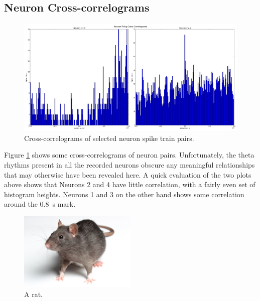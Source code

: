 \documentclass[a4paper, 10pt]{article}
\begin{document}
\subsection*{Neuron Cross-correlograms}
\begin{figure}[H]
  \centering
  \includegraphics[width=1.0\textwidth]{neuron_xcorr_plot.png}
  \caption{Cross-correlograms of selected neuron spike train pairs.}
  \label{fig:xcorr}
\end{figure}

Figure \ref{fig:xcorr} shows some cross-correlograms of neuron
pairs. Unfortunately, the theta rhythms present in all the recorded neurons
obscure any meaningful relationships that may otherwise have been revealed
here. A quick evaluation of the two plots above shows that Neurons 2 and 4 have
little correlation, with a fairly even set of histogram heights. Neurons 1 and 3
on the other hand shows some correlation around the \SI{0.8}{\second} mark.


\begin{figure}[H]
  \centering
  \includegraphics[width=0.5\textwidth]{rat_6.jpg}
  \caption{A rat\protect\footnotemark.}
  \label{fig:rat}
\end{figure}

\end{document}
